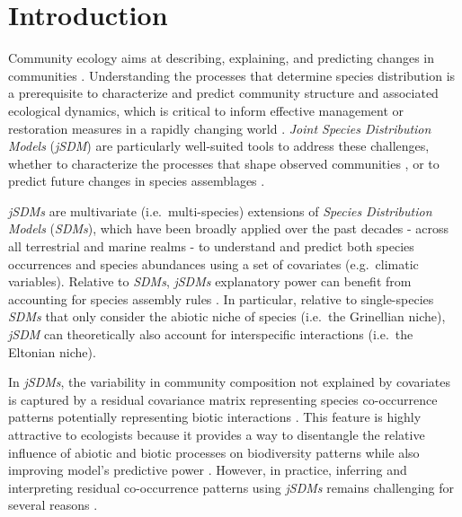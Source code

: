 \documentclass[9pt,biorxiv,doublespacing,lineno]{lapreprint}
\begin{document}
\hypertarget{introduction}{%
\section{Introduction}\label{introduction}}

Community ecology aims at describing, explaining, and predicting changes
in communities \autocite{Tredennick_2021}. Understanding the processes
that determine species distribution is a prerequisite to characterize
and predict community structure and associated ecological dynamics,
which is critical to inform effective management or restoration measures
in a rapidly changing world \autocites[ ]{Dietze_2018}{Brudvig_2022}.
\emph{Joint Species Distribution Models} (\emph{jSDM}) are particularly
well-suited tools to address these challenges, whether to characterize
the processes that shape observed communities \autocites[
]{Warton_2015}{Ovaskainen_2017b}, or to predict future changes in
species assemblages \autocites[ ]{Norberg_2019}{Pollock_2020}.

\emph{jSDMs} are multivariate (i.e.~multi-species) extensions of
\emph{Species Distribution Models} (\emph{SDMs}), which have been
broadly applied over the past decades - across all terrestrial and
marine realms - to understand and predict both species occurrences
\autocites[ ]{Elith_2006}{Norberg_2019} and species abundances
\autocites[ ]{Howard_2014}{Waldock_2022} using a set of covariates
(e.g.~climatic variables). Relative to \emph{SDMs}, \emph{jSDMs}
explanatory power can benefit from accounting for species assembly rules
\autocite{Ovaskainen_2017a}. In particular, relative to single-species
\emph{SDMs} that only consider the abiotic niche of species (i.e.~the
Grinellian niche), \emph{jSDM} can theoretically also account for
interspecific interactions (i.e.~the Eltonian niche).

In \emph{jSDMs}, the variability in community composition not explained
by covariates is captured by a residual covariance matrix representing
species co-occurrence patterns potentially representing biotic
interactions \autocite{Ovaskainen_2017a}. This feature is highly
attractive to ecologists because it provides a way to disentangle the
relative influence of abiotic and biotic processes on biodiversity
patterns \autocite{Godsoe_2017} while also improving model's predictive
power \autocites[ ]{Giannini_2013}{Staniczenko_2017}. However, in
practice, inferring and interpreting residual co-occurrence patterns
using \emph{jSDMs} remains challenging for several reasons \autocites[
]{Blanchet_2020}{Holt_2020}.
\end{document}
